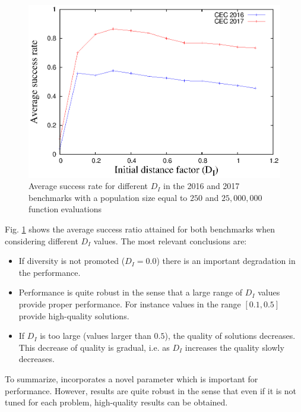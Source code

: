 \begin{figure}[t]
\centering
  \includegraphics[scale=0.3, angle=-90]{img/Tuning_CEC.eps}
\caption{Average success rate for different $D_I$ in the \CEC{} 2016 and \CEC{} 2017 benchmarks with a population size equal to $250$ and $25,000,000$ function evaluations}
\label{fig:one}
\end{figure}

Fig. \ref{fig:one} shows the average success ratio attained for both benchmarks when considering different $D_I$ values.
%
The most relevant conclusions are:
\begin{itemize}
\item If diversity is not promoted ($D_I = 0.0 $) there is an important degradation in the performance. 
\item Performance is quite robust in the sense that a large range of $D_I$ values provide proper performance. For instance values
in the range $[0.1, 0.5]$ provide high-quality solutions.
\item If $D_I$ is too large (values larger than $0.5$), the quality of solutions decreases. This decrease of quality is gradual, i.e. as $D_I$ increases the quality slowly decreases.
\end{itemize}

To summarize, \DEEDM{} incorporates a novel parameter which is important for performance.
%
However, results are quite robust in the sense that even if it is not tuned for each problem, high-quality results can be obtained.
